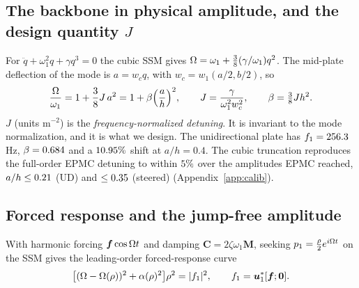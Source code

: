 \subsection{The backbone in physical amplitude, and the design quantity $J$}
For $\ddot q+\omega_1^2q+\gamma q^3=0$ the cubic SSM gives
$\Omega=\omega_1+\tfrac38(\gamma/\omega_1)q^2$. The mid-plate deflection of the mode is
$a=w_cq$, with $w_c=w_1(a/2,b/2)$, so
\begin{equation}
\frac{\Omega}{\omega_1}=1+\frac38J\,a^2=1+\beta\Big(\frac{a}{h}\Big)^2,\qquad
J=\frac{\gamma}{\omega_1^2w_c^2},\qquad \beta=\tfrac38Jh^2 .
\label{eq:J}
\end{equation}
$J$ (units m$^{-2}$) is the \emph{frequency-normalized detuning}. It is invariant to the
mode normalization, and it is what we design. The unidirectional plate has
$f_1=256.3$\,Hz, $\beta=0.684$ and a $10.95\%$ shift at $a/h=0.4$.
The cubic truncation reproduces the full-order EPMC detuning to within $5\%$ over the
amplitudes EPMC reached, $a/h\le0.21$ (UD) and $\le0.35$ (steered) (Appendix~\ref{app:calib}).

\subsection{Forced response and the jump-free amplitude}\label{sec:jumpth}
With harmonic forcing $\bm f\cos\Omega t$ and damping $\bm C=2\zeta\omega_1\bm M$, seeking
$p_1=\tfrac\rho2e^{i\Omega t}$ on the SSM gives the leading-order forced-response curve
\begin{equation}
\big[(\Omega-\Omega(\rho))^2+\alpha(\rho)^2\big]\rho^2=|f_1|^2,\qquad f_1=\bm u_1^*[\bm f;\bm0].
\label{eq:frc}
\end{equation}

